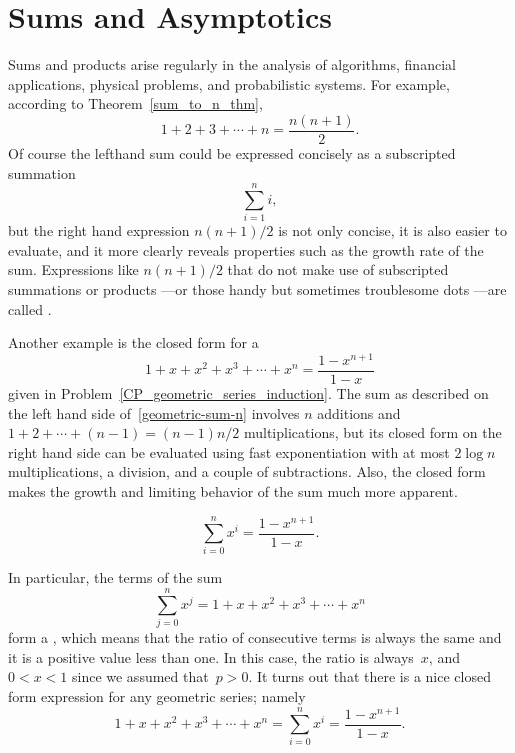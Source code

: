 \chapter{Sums and Asymptotics}\label{chap:asymptotics}

Sums and products arise regularly in the analysis of algorithms,
financial applications, physical problems, and probabilistic systems.
For example, according to Theorem~\ref{sum_to_n_thm},
\begin{equation}\label{sum1n_closedform}
1 + 2 + 3 +\cdots + n = \frac{n(n+1)}{2}.
\end{equation}
Of course the lefthand sum could be expressed concisely as a subscripted summation
\[
\sum_{i=1}^n i,
\]
but the right hand expression $n(n+1)/2$ is not only concise, it is
also easier to evaluate, and it more clearly reveals properties such
as the growth rate of the sum.  Expressions like $n(n+1)/2$ that do
not make use of subscripted summations or products ---or those handy
but sometimes troublesome dots ---are called .

Another example is the closed form for a 
\begin{equation}\label{geometric-sum-n}
1 + x + x^2 + x^3 + \cdots + x^{n} = \frac{1 - x^{n+1}}{1 - x}
\end{equation}
given in Problem~\ref{CP_geometric_series_induction}.  The sum as
described on the left hand side of~\eqref{geometric-sum-n} involves
$n$ additions and $1 + 2 + \cdots + (n-1) = (n-1)n/2$ multiplications,
but its closed form on the right hand side can be evaluated using fast
exponentiation with at most $2 \log n$ multiplications, a division,
and a couple of subtractions.  Also, the closed form makes the growth
and limiting behavior of the sum much more apparent.

\iffalse

\begin{equation}\label{geometric-sum-n-1}
    \sum_{i = 0}^{n} x^i = \frac{1 - x^{n+1}}{1 - x}.
\end{equation}

In particular, the terms of the sum
\[
    \sum_{j = 0}^{n} x^j = 1 + x + x^2 + x^3 + \cdots + x^{n}
\]
form a , which means that the ratio of
consecutive terms is always the same and it is a positive value less
than one.  In this case, the ratio is always~$x$, and $0 < x < 1$
since we assumed that~$p > 0$.  It turns out that there is a nice
closed form expression for any geometric series; namely
\begin{equation}\label{geometric-sum-n-1}
1 + x + x^2 + x^3 + \cdots + x^{n} = \sum_{i = 0}^{n} x^i = \frac{1 - x^{n+1}}{1 - x}.
\end{equation}


